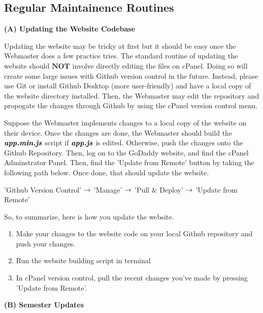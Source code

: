 \documentclass[a4paper]{article}
\begin{document}
\subsection{Regular Maintainence Routines}


\begin{center}
\textbf{(A) Updating the Website Codebase}
\end{center}

Updating the website may be tricky at first but it should be easy once the Webmaster does a few practice tries. The standard routine of updating the website should $\textbf{NOT}$ involve directly editing the files on cPanel. Doing so will create some large issues with Github version control in the future. Instead, please use Git or install Github Desktop (more user-friendly) and have a local copy of the website directory installed. Then, the Webmaster may edit the repository and propogate the changes through Github by using the cPanel version control menu.

Suppose the Webmaster implements changes to a local copy of the website on their device. Once the changes are done, the Webmaster should build the $\textbf{\textit{app.min.js}}$ script if $\textbf{\textit{app.js}}$ is edited. Otherwise, push the changes onto the Github Repository. Then, log on to the GoDaddy website, and find the cPanel Adminstrator Panel. Then, find the 'Update from Remote' button by taking the following path below. Once done, that should update the website.
\begin{center}
'Github Version Control' $\rightarrow$ 'Manage' $\rightarrow$ 'Pull $\&$ Deploy' $\rightarrow$ 'Update from Remote'
\end{center}

So, to summarize, here is how you update the website.

\begin{enumerate}
  \item Make your changes to the website code on your local Github repository and push your changes.
  \item Run the website building script in terminal
  \item In cPanel version control, pull the recent changes you've made by pressing 'Update from Remote'.
\end{enumerate}


\begin{center}
\textbf{(B) Semester Updates}
\end{center}
\end{document}
